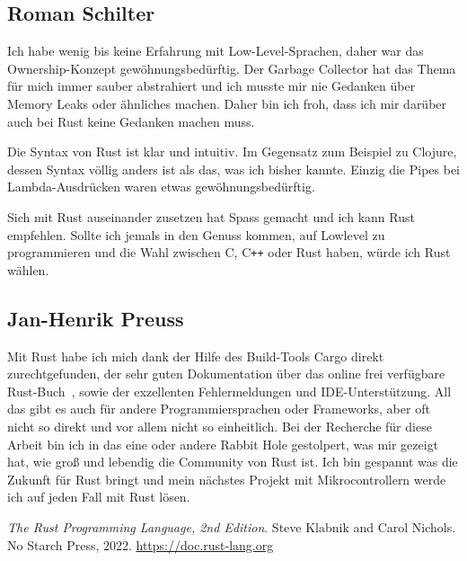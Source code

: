 \documentclass[letterpaper,12pt]{article}
\begin{document}
    \subsection{Roman Schilter}\label{subsec:roman}
    Ich habe wenig bis keine Erfahrung mit Low-Level-Sprachen, daher war das Ownership-Konzept gewöhnungsbedürftig.
    Der Garbage Collector hat das Thema für mich immer sauber abstrahiert und ich musste mir nie Gedanken über Memory Leaks oder ähnliches machen.
    Daher bin ich froh, dass ich mir darüber auch bei Rust keine Gedanken machen muss.

    Die Syntax von Rust ist klar und intuitiv.
    Im Gegensatz zum Beispiel zu Clojure, dessen Syntax völlig anders ist als das, was ich bisher kannte.
    Einzig die Pipes bei Lambda-Ausdrücken waren etwas gewöhnungsbedürftig.

    Sich mit Rust auseinander zusetzen hat Spass gemacht und ich kann Rust empfehlen.
    Sollte ich jemals in den Genuss kommen, auf Lowlevel zu programmieren und die Wahl zwischen C, C\texttt{++} oder Rust haben,
        würde ich Rust wählen.

    \subsection{Jan-Henrik Preuss}\label{subsec:jan}
    Mit Rust habe ich mich dank der Hilfe des Build-Tools Cargo direkt zurechtgefunden,
    der sehr guten Dokumentation über das online frei verfügbare Rust-Buch~\cite{rust-book}, sowie der exzellenten Fehlermeldungen und IDE-Unterstützung.
    All das gibt es auch für andere Programmiersprachen oder Frameworks, aber oft nicht so direkt und vor allem nicht so einheitlich.
    Bei der Recherche für diese Arbeit bin ich in das eine oder andere Rabbit Hole gestolpert, was mir gezeigt hat, wie groß und lebendig die Community von Rust ist.
    Ich bin gespannt was die Zukunft für Rust bringt und mein nächstes Projekt mit Mikrocontrollern werde ich auf jeden Fall mit Rust lösen.


    \begin{thebibliography}{9}

        \emph{The Rust Programming Language, 2nd Edition}.
        \newblock Steve Klabnik and Carol Nichols.
        \newblock No Starch Press, 2022.
        \newblock \url{https://doc.rust-lang.org}
    \end{thebibliography}
\end{document}
